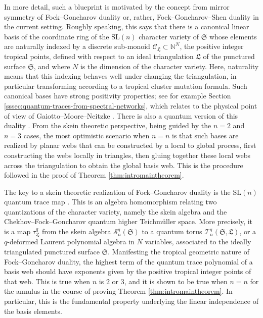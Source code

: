 \documentclass[12pt,
	]{amsart}
\theoremstyle{definition}
\newcommand{\mrm}[1]{\mathrm{#1}}
\newcommand{\mbb}[1]{\mathbb{#1}}
\newcommand{\mcal}[1]{\mathcal{#1}}
\newcommand{\mfrak}[1]{\mathfrak{#1}}
\newcommand{\nnegZ}{\mbb{N}}
\newcommand{\nsl}{\mrm{SL}(n)}
\newcommand{\sk}{\mcal{S}_n^q}
\newcommand{\surf}{\mfrak{S}}
\newcommand{\idealtriang}{\mfrak{L}}
\newcommand{\qtr}{\tau^q_\idealtriang}
\newcommand{\fan}{\mcal{C}}
\begin{document}
In more detail, such a blueprint is motivated by the concept from mirror symmetry of Fock--Goncharov duality  \cite{FockArxiv97, fockMR2233852, grossMR3758151} or, rather, Fock--Goncharov--Shen duality \cite{goncharovMR3418241, goncharov2022quantum} in the current setting.  Roughly speaking, this says that there is a canonical linear basis of the coordinate ring of the $\nsl$ character variety of $\surf $ whose elements are naturally indexed by a discrete sub-monoid $\fan_\idealtriang\subset\nnegZ^N$, the positive integer tropical points, defined with respect to an ideal triangulation $\idealtriang$ of the punctured surface $\surf$, and where $N$ is the dimension of the character variety.  Here, naturality means that this indexing behaves well under changing the triangulation, in particular transforming according to a tropical cluster mutation formula.  Such canonical bases have strong positivity properties; see for example Section \ref{sssec:quantum-traces-from-spectral-networks}, which relates to the physical point of view of Gaiotto--Moore--Neitzke \cite{gaiottoMR3250763}.  There is also a quantum version of this duality \cite{davisonMR4337972, fockMR2567745}.  From the skein theoretic perspective, being guided by the $n=2$ and $n=3$ cases, the most optimistic scenario when $n=n$ is that such bases are realized by planar webs that can be constructed by a local to global process, first constructing the webs locally in triangles, then gluing together these local webs across the triangulation to obtain the global basis web.  This is the procedure followed in the proof of Theorem \ref{thm:intromaintheorem}.

The key to a skein theoretic realization of Fock--Goncharov duality is the $\nsl$ quantum trace map \cite{bonahonMR2851072, ChekhovCzechJPhys00, douglasMR4717274, gabellaMR3613514, kim2022rm, le2023quantum, neitzkeMR4190271}.  This is an algebra homomorphism relating two quantizations of the character variety, namely the skein algebra and the Chekhov--Fock--Goncharov quantum higher Teichm\"{u}ller space.  More precisely, it is a map $\qtr$ from the skein algebra $\sk(\surf)$ to a quantum torus $\mcal{T}_n^q(\surf,\idealtriang)$, or a $q$-deformed Laurent polynomial algebra in $N$ variables, associated to the ideally triangulated punctured surface $\surf$.  Manifesting the tropical geometric nature of Fock--Goncharov duality, the highest term of the quantum trace polynomial of a basis web should have exponents given by the positive tropical integer points of that web.  This is true when $n$ is $2$ or $3$, and it is shown to be true when $n=n$ for the annulus in the course of proving Theorem \ref{thm:intromaintheorem}.  In particular, this is the fundamental property underlying the linear independence of the basis elements.  
\end{document}
